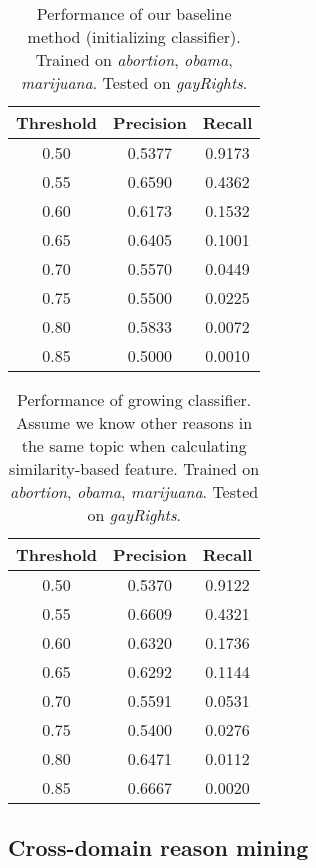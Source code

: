 \documentclass[11pt,a4paper]{article}
\begin{document}
\begin{table}[h]
\begin{center}
\begin{tabular}{|c||c|c|}
\hline \bf Threshold & \bf Precision & \bf Recall \\ \hline\hline
0.50& 0.5377    & 0.9173 \\
0.55& 0.6590    & 0.4362 \\
0.60& 0.6173    & 0.1532 \\
0.65& 0.6405    & 0.1001 \\
0.70& 0.5570    & 0.0449 \\
0.75& 0.5500    & 0.0225 \\
0.80& 0.5833    & 0.0072 \\
0.85& 0.5000    & 0.0010 \\ 
\hline
\end{tabular}
\end{center}
\caption{\label{tab:ic} Performance of our baseline method (initializing classifier). Trained on {\it abortion}, {\it obama}, {\it marijuana}. Tested on {\it gayRights}.}
\end{table}

\begin{table}[h]
\begin{center}
\begin{tabular}{|c||c|c|}
\hline \bf Threshold & \bf Precision & \bf Recall \\ \hline\hline
0.50 & 0.5370 & 0.9122 \\
0.55 & 0.6609 & 0.4321 \\
0.60 & 0.6320 & 0.1736 \\
0.65 & 0.6292 & 0.1144 \\
0.70 & 0.5591 & 0.0531 \\
0.75 & 0.5400 & 0.0276 \\
0.80 & 0.6471 & 0.0112 \\
0.85 & 0.6667 & 0.0020 \\
\hline
\end{tabular}
\end{center}
\caption{\label{tab:gc} Performance of growing classifier. Assume we know other reasons in the same topic when calculating similarity-based feature. Trained on {\it abortion}, {\it obama}, {\it marijuana}. Tested on {\it gayRights}.}
\end{table}

\subsection{Cross-domain reason mining}
\end{document}
